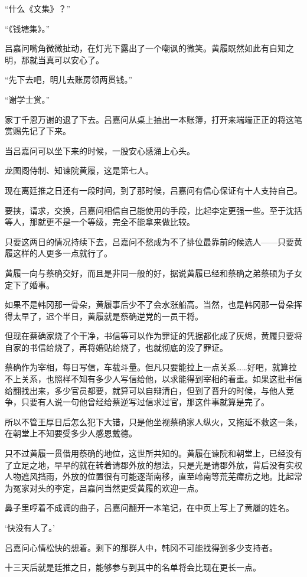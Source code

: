 “什么《文集》？”

“《钱塘集》。”

吕嘉问嘴角微微扯动，在灯光下露出了一个嘲讽的微笑。黄履既然如此有自知之明，那就当真可以安心了。

“先下去吧，明儿去账房领两贯钱。”

“谢学士赏。”

家丁千恩万谢的退了下去。吕嘉问从桌上抽出一本账簿，打开来端端正正的将这笔赏赐先记了下来。

当吕嘉问可以坐下来的时候，一股安心感涌上心头。

龙图阁侍制、知谏院黄履，这是第七人。

现在离廷推之日还有一段时间，到了那时候，吕嘉问有信心保证有十人支持自己。

要挟，请求，交换，吕嘉问相信自己能使用的手段，比起李定更强一些。至于沈括等人，那就更不是一个等级，完全不能拿来做比较。

只要这两日的情况持续下去，吕嘉问不愁成为不了排位最靠前的候选人——只要黄履这样的人更多一点就行了。

黄履一向与蔡确交好，而且是非同一般的好，据说黄履已经和蔡确之弟蔡硕为子女定下了婚事。

如果不是韩冈那一骨朵，黄履事后少不了会水涨船高。当然，也是韩冈那一骨朵挥得太早了，迟个半日，黄履就是蔡确逆党的一员干将。

但现在蔡确家烧了个干净，书信等可以作为罪证的凭据都化成了灰烬，黄履只要将自家的书信给烧了，再将婚贴给烧了，也就彻底的没了罪证。

蔡确作为宰相，每日写信，车载斗量。但凡只要能拉上一点关系……好吧，就算拉不上关系，也照样不知有多少人写信给他，以求能得到宰相的看重。如果这批书信给翻找出来，多少官员都要，就算可以自辩清白，但到了晋升的时候，与他人竞争，只要有人说一句他曾经给蔡逆写过信求过官，那这件事就算是完了。

所以不管王厚日后怎么犯下大错，只是他坐视蔡确家人纵火，又拖延不救这一条，在朝堂上不知要受多少人感恩戴德。

只不过黄履一贯借用蔡确的地位，这世所共知的。黄履在谏院和朝堂上，已经没有了立足之地，早早的就在转着请郡外放的想法，只是光是请郡外放，背后没有实权人物遮风挡雨，外放的位置很有可能逐渐南移，直至岭南等荒芜瘴疠之地。比起常为冤家对头的李定，吕嘉问当然更受黄履的欢迎一点。

鼻子里哼着不成调的曲子，吕嘉问翻开一本笔记，在中页上写上了黄履的姓名。

‘快没有人了。’

吕嘉问心情松快的想着。剩下的那群人中，韩冈不可能找得到多少支持者。

十三天后就是廷推之日，能够参与到其中的名单将会比现在更长一点。

